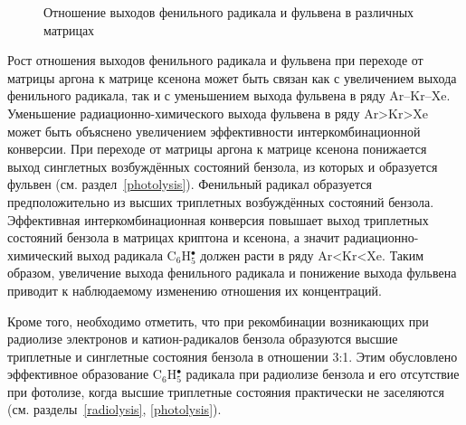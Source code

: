 { \begin{figure}[h!]
\caption{Отношение выходов фенильного радикала и фульвена в различных матрицах}
\label{rel}
\end{figure}

Рост отношения выходов фенильного радикала и фульвена при переходе от матрицы аргона к матрице ксенона может быть связан как с увеличением выхода фенильного радикала, так и с уменьшением выхода фульвена в ряду Ar--Kr--Xe. Уменьшение радиационно-химического выхода фульвена в ряду Ar>Kr>Xe может быть объяснено увеличением эффективности интеркомбинационной конверсии. При переходе от матрицы аргона к матрице ксенона
понижается выход синглетных возбуждённых состояний бензола, из которых и образуется фульвен (см. раздел~\ref{photolysis}). Фенильный радикал образуется предположительно из высших триплетных возбуждённых состояний бензола. Эффективная интеркомбинационная конверсия повышает выход триплетных состояний бензола в матрицах криптона и ксенона, а значит радиационно-химический выход радикала C$_6$H$_5^\bullet$ должен расти в ряду Ar<Kr<Xe. Таким образом, увеличение выхода фенильного радикала и понижение выхода фульвена приводит к наблюдаемому изменению отношения их концентраций. 

Кроме того, необходимо отметить, что при рекомбинации возникающих при радиолизе электронов и катион-радикалов бензола образуются высшие триплетные и синглетные состояния бензола в отношении 3:1.  Этим обусловлено эффективное образование C$_6$H$_5^\bullet$ радикала при радиолизе бензола и его отсутствие при фотолизе, когда  высшие триплетные состояния практически не заселяются (см. разделы~\ref{radiolysis}, \ref{photolysis}). 


}
